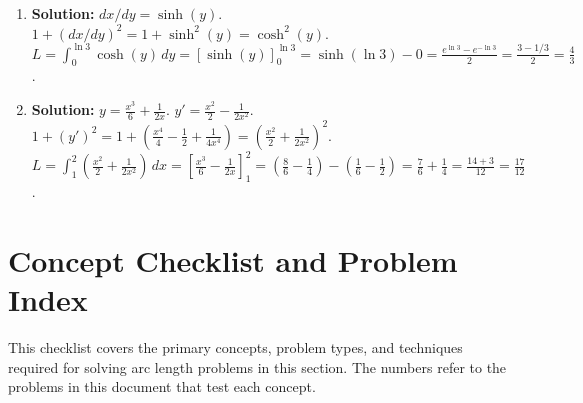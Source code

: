\documentclass[12pt]{article}
\begin{document}
\begin{enumerate}
    \item \textbf{Solution:} $dx/dy=\sinh(y)$. $1+(dx/dy)^2=1+\sinh^2(y)=\cosh^2(y)$.
    $L=\int_0^{\ln 3} \cosh(y) \,dy = [\sinh(y)]_0^{\ln 3} = \sinh(\ln 3) - 0 = \frac{e^{\ln 3}-e^{-\ln 3}}{2} = \frac{3-1/3}{2}=\frac{4}{3}$.
    
    \item \textbf{Solution:} $y=\frac{x^3}{6}+\frac{1}{2x}$. $y'=\frac{x^2}{2}-\frac{1}{2x^2}$. $1+(y')^2=1+(\frac{x^4}{4}-\frac{1}{2}+\frac{1}{4x^4})=(\frac{x^2}{2}+\frac{1}{2x^2})^2$.
    $L=\int_1^2(\frac{x^2}{2}+\frac{1}{2x^2})\,dx=[\frac{x^3}{6}-\frac{1}{2x}]_1^2=(\frac{8}{6}-\frac{1}{4})-(\frac{1}{6}-\frac{1}{2})=\frac{7}{6}+\frac{1}{4}=\frac{14+3}{12}=\frac{17}{12}$.
\end{enumerate}

\newpage
\section*{Concept Checklist and Problem Index}

This checklist covers the primary concepts, problem types, and techniques required for solving arc length problems in this section. The numbers refer to the problems in this document that test each concept.
\end{document}
